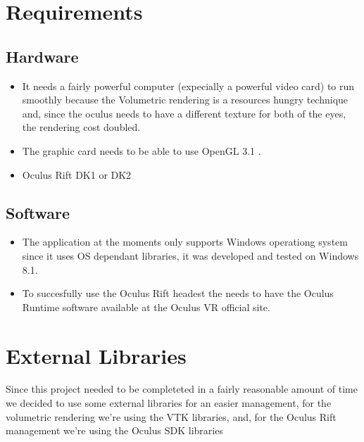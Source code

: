 \documentclass[11pt]{article} %
\begin{document}



\newpage
\section{Requirements}

\subsection{Hardware}
\begin{itemize}
\item It needs a fairly powerful computer (expecially a powerful video card) to run smoothly because the Volumetric rendering is a resources hungry technique and, since the oculus needs to have a different texture for both of the eyes, the rendering cost doubled.

\item The graphic card needs to be able to use OpenGL 3.1 .

\item Oculus Rift DK1 or DK2
\end{itemize}


\subsection{Software}
\begin{itemize}
\item The application at the moments only supports Windows operationg system since it uses OS dependant libraries, it was developed and tested on Windows 8.1.
\item To succesfully use the Oculus Rift headest the needs to have the Oculus Runtime software available at the Oculus VR official site.
\end{itemize}













\newpage
\section{External Libraries}
Since this project needed to be completeted in a fairly reasonable amount of time we decided to use some external libraries for an easier management, for the volumetric rendering we're using the VTK libraries, and, for the Oculus Rift management we're using the Oculus SDK libraries
\end{document}
